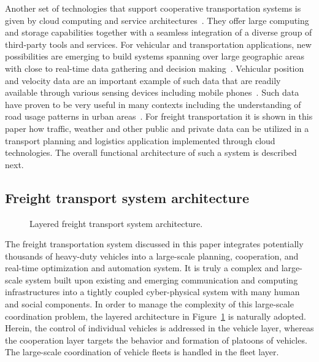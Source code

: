 \documentclass[journal]{IEEEtran}
\begin{document}
Another set of technologies that support cooperative transportation systems is given by cloud computing and service architectures~\cite{armbrust_2010}. They
offer large computing and storage capabilities together with a seamless integration of a diverse group of third-party tools and services. For vehicular and transportation applications, new possibilities are emerging to build systems spanning over large geographic areas with close to real-time data gathering and decision making~\cite{whaiduzzaman_2014}. Vehicular position and velocity data are an important example of such data that are readily available through various sensing devices including mobile phones~\cite{herrera+10}. Such data have proven to be very useful in many contexts including the understanding of road usage patterns in urban areas~\cite{wang+12}. For freight transportation it is shown in this paper how traffic, weather and other public and private data can be utilized in a transport planning and logistics application implemented through cloud technologies. The overall functional architecture of such a system is
described next.


\subsection{Freight transport system architecture}\label{sec_freighttransport}

\begin{figure}
\begin{center}
\caption{Layered freight transport system architecture.}
\label{fig_architecture}
\end{center}
\end{figure}

The freight transportation system discussed in this paper integrates potentially thousands of heavy-duty vehicles into a large-scale planning, cooperation, and real-time optimization and automation system. It is truly a complex and large-scale system built upon existing and emerging communication and computing infrastructures into a tightly coupled cyber-physical system with many human and social components. In order to manage the complexity of this large-scale coordination problem, the layered architecture in Figure~\ref{fig_architecture} is naturally adopted. Herein, the control of individual vehicles is addressed in the vehicle layer, whereas the cooperation layer targets the behavior and formation of platoons of vehicles. The large-scale coordination of vehicle fleets is handled in the fleet layer.
\end{document}
